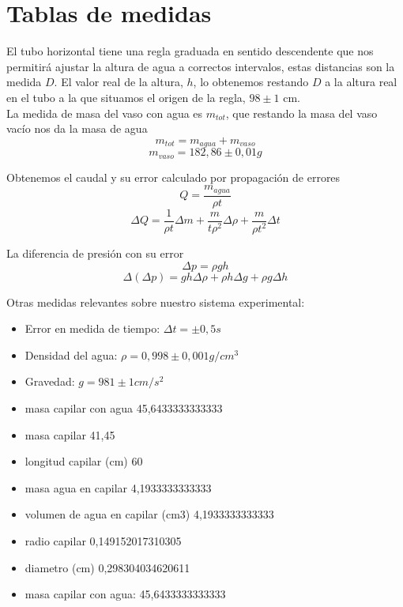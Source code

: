 \documentclass[a4paper,12pt,spanish]{article}
\begin{document}
	\section{Tablas de medidas}
	
	
	El tubo horizontal tiene una regla graduada en sentido descendente que nos permitirá ajustar la altura de agua a correctos intervalos, estas distancias son la medida $D$. El valor real de la altura, $h$, lo obtenemos restando $D$ a la altura real en el tubo a la que situamos el origen de la regla, $98\pm 1 $ cm.\\

	La medida de masa del vaso con agua es $m_{tot}$, que restando la masa del vaso vacío nos da la masa de agua
	\[ m_{tot} = m_{agua} + m_{vaso}
	\]
	\[ m_{vaso} = 182,86 \pm 0,01 \si{g}
	\]
	
	Obtenemos el caudal y su error calculado por propagación de errores
	\[ Q = \frac{m_{agua}}{\rho t}
	\]
	\[\Delta Q = \frac{1}{\rho t} \Delta m+ \frac{m}{t\rho^2}\Delta \rho + \frac{m}{\rho t^2}\Delta t
	\]
	
	La diferencia de presión con su error
	\[ \mathit{\Delta} p = \rho g h
	\]
	\[ \Delta (\mathit{\Delta} p) = g h \Delta \rho + \rho h \Delta g + \rho g \Delta h 
	\]
	
	
	\vspace{\baselineskip}
	
	Otras medidas relevantes sobre nuestro sistema experimental:
	
	\begin{itemize}
		\item Error en medida de tiempo: $\Delta t = \pm 0,5 \si{s}$
		\item Densidad del agua: $\rho = 0,998\pm 0,001 \si{g/cm^3 }$
		\item Gravedad: $g = 981\pm 1 \si{cm/s^2}$
		\item masa capilar con agua	45,6433333333333
		\item masa capilar	41,45
		\item longitud capilar (cm)	60
		\item masa agua en capilar	4,1933333333333    %
		\item volumen de agua en capilar (cm3)	4,1933333333333
		\item radio capilar	0,149152017310305
		\item diametro (cm)	0,298304034620611
		\item masa capilar con agua: 45,6433333333333
	\end{itemize}
	
\end{document}
